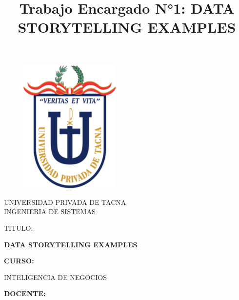 \documentclass{article}
\begin{document}
\title{Trabajo Encargado N°1: DATA STORYTELLING EXAMPLES}
\begin{titlepage}
\begin{figure}[htb]
\begin{center}
\includegraphics[width=5cm]{logo.png}
\end{center}
\end{figure}
\vspace*{-0.25in}
\begin{center}
\large{UNIVERSIDAD PRIVADA DE TACNA}\\
\vspace*{-0.025in}
INGENIERIA DE SISTEMAS  \\

\vspace*{0.5in}
\begin{large}
TITULO:\\
\end{large}

\vspace*{0.1in}
\begin{Large}
\textbf{DATA STORYTELLING EXAMPLES} \\
\end{Large}

\vspace*{0.3in}
\begin{Large}
\textbf{CURSO:} \\
\end{Large}

\vspace*{0.1in}
\begin{large}
INTELIGENCIA DE NEGOCIOS\\
\end{large}

\vspace*{0.3in}
\begin{Large}
\textbf{DOCENTE:} \\
\end{Large}


\end{center}
\end{titlepage}
\end{document}

